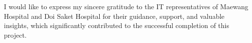 %

\begin{acknowledgments}
I would like to express my sincere gratitude to the IT representatives of Maewang Hospital and Doi Saket Hospital for their guidance, support, and valuable insights, which significantly contributed to the successful completion of this project.


\end{acknowledgments}%
\fi %

\contentspage

\ifproject
\figurelistpage

\tablelistpage
\fi %



